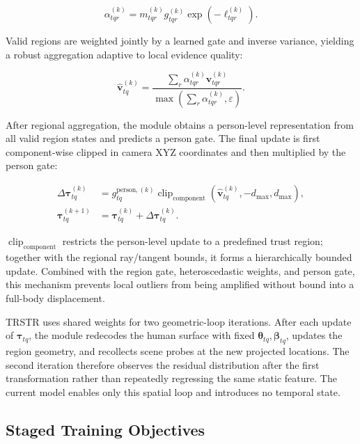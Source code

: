 \documentclass{article}
\begin{document}
\begin{equation}
\alpha_{tqr}^{(k)}
=m_{tqr}^{(k)}g_{tqr}^{(k)}
\exp\!\left(-\ell_{tqr}^{(k)}\right).
\label{eq:precision-weight}
\end{equation}

Valid regions are weighted jointly by a learned gate and inverse variance, yielding a robust aggregation adaptive to local evidence quality:

\begin{equation}
\widehat{\mathbf{v}}_{tq}^{(k)}
=\frac{\sum_r\alpha_{tqr}^{(k)}\mathbf{v}_{tqr}^{(k)}}
{\max\!\left(\sum_r\alpha_{tqr}^{(k)},\varepsilon\right)}.
\label{eq:vote-aggregation}
\end{equation}

After regional aggregation, the module obtains a person-level representation from all valid region states and predicts a person gate. The final update is first component-wise clipped in camera XYZ coordinates and then multiplied by the person gate:

\begin{align}
\Delta\boldsymbol{\tau}_{tq}^{(k)}
&=g_{tq}^{\mathrm{person},(k)}
\operatorname{clip}_{\mathrm{component}}\!\left(
\widehat{\mathbf{v}}_{tq}^{(k)},-d_{\max},d_{\max}\right),
\label{eq:person-update}\\
\boldsymbol{\tau}_{tq}^{(k+1)}
&=\boldsymbol{\tau}_{tq}^{(k)}
+\Delta\boldsymbol{\tau}_{tq}^{(k)}.
\label{eq:translation-iteration}
\end{align}

$\operatorname{clip}_{\mathrm{component}}$ restricts the person-level update to a predefined trust region; together with the regional ray/tangent bounds, it forms a hierarchically bounded update. Combined with the region gate, heteroscedastic weights, and person gate, this mechanism prevents local outliers from being amplified without bound into a full-body displacement.

TRSTR uses shared weights for two geometric-loop iterations. After each update of $\boldsymbol{\tau}_{tq}$, the module redecodes the human surface with fixed $\boldsymbol{\theta}_{tq},\boldsymbol{\beta}_{tq}$, updates the region geometry, and recollects scene probes at the new projected locations. The second iteration therefore observes the residual distribution after the first transformation rather than repeatedly regressing the same static feature. The current model enables only this spatial loop and introduces no temporal state.

\subsection{Staged Training Objectives}
\end{document}
